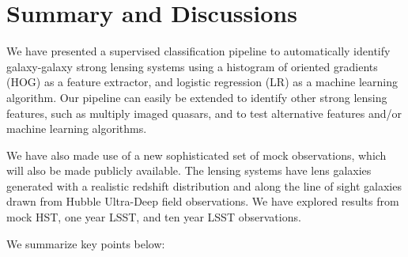 \documentclass{emulateapj}
\begin{document}
\section{Summary and Discussions}
\label{sec:conclusions}

We have presented a supervised classification pipeline to
automatically identify galaxy-galaxy strong lensing systems using a
histogram of oriented gradients (HOG) as a feature extractor, and
logistic regression (LR) as a machine learning algorithm.  Our
pipeline can easily be extended to identify other strong lensing
features, such as multiply imaged quasars, and to test alternative
features and/or machine learning algorithms.


We have also made use of a new sophisticated set of mock observations,
which will also be made publicly available.  The lensing systems have
lens galaxies generated with a realistic redshift distribution and
along the line of sight galaxies drawn from Hubble Ultra-Deep field
observations.  We have explored results from mock HST, one year LSST,
and ten year LSST observations.


We summarize key points below:
\end{document}
